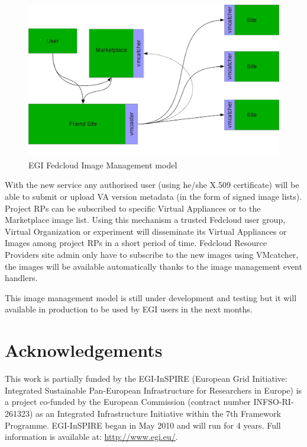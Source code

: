 \documentclass{cai}
\begin{document}
\begin{figure}
\centering
\includegraphics[width=1\textwidth]{egi_model.png}
\caption{EGI Fedcloud Image Management model}
\label{fig:egimodel}
\end{figure}
With the new service any authorised user (using he/she X.509 certificate) will be able to submit or upload VA version metadata (in the form of signed image lists). 
Project RPs can be subscribed to specific Virtual Appliances or to the Marketplace image list. Using this mechanism a trusted Fedcloud user group, Virtual Organization or experiment will disseminate its Virtual Appliances or Images among project RPs in a short period of time.
Fedcloud Resource Providers site admin only have to subscribe to the new images using VMcatcher, the images will be available automatically thanks to the image management event handlers.

This image management model is still under development and testing but it will available in production to be used by EGI users in the next months.

\section{Acknowledgements}
\label{sect-acknowledgements}
This work is partially funded by the  EGI-InSPIRE (European Grid Initiative: Integrated Sustainable
Pan-European Infrastructure for Researchers in Europe) is a project co-funded by the European Commission 
(contract number INFSO-RI-261323) as an Integrated Infrastructure Initiative within the 7th Framework 
Programme. EGI-InSPIRE began in May 2010 and will run for 4 years. Full information is available at:
\url{http://www.egi.eu/}.
\end{document}
